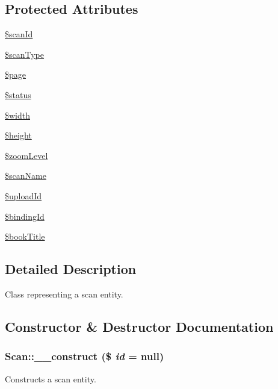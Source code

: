 \subsection*{Protected Attributes}
\begin{DoxyCompactItemize}
\item 
\hyperlink{classScan_a4a0ff118e90fc192615f59bbb32e5a7e}{\$scanId}
\item 
\hyperlink{classScan_a16f9fddedd31312186eacf832862a140}{\$scanType}
\item 
\hyperlink{classScan_a5c7dcddddb9fbb8d6f97a1f0772753c7}{\$page}
\item 
\hyperlink{classScan_a792a6afa609cf3facf8162de86cb2299}{\$status}
\item 
\hyperlink{classScan_a9d74b1c9b56be79120ff60afea7260c6}{\$width}
\item 
\hyperlink{classScan_a4504208647e43fc37d30da80988c7ebb}{\$height}
\item 
\hyperlink{classScan_ade9d70de4af2677cd62ce8b9604cb3f2}{\$zoomLevel}
\item 
\hyperlink{classScan_a2762cebb2c691ca93dd6c5866a2d4fcd}{\$scanName}
\item 
\hyperlink{classScan_a018817763039daa0dcbc13b97badfa4a}{\$uploadId}
\item 
\hyperlink{classScan_a966a05e2f36cbb45f71123414db8aafa}{\$bindingId}
\item 
\hyperlink{classScan_a82f0e949f2e2d21402be3299719d04e9}{\$bookTitle}
\end{DoxyCompactItemize}


\subsection{Detailed Description}
Class representing a scan entity. 

\subsection{Constructor \& Destructor Documentation}
\hypertarget{classScan_ab363efba88dd615f165bc1466558b5ed}{
\subsubsection[{\_\-\_\-construct}]{\setlength{\rightskip}{0pt plus 5cm}Scan::\_\-\_\-construct (\$ {\em id} = {\ttfamily null})}}
\label{classScan_ab363efba88dd615f165bc1466558b5ed}
Constructs a scan entity.



